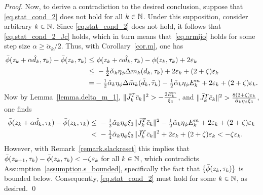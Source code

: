 \begin{proof}
    Now, to derive a contradiction to the desired conclusion, suppose that \eqref{eq.stat_cond_2} does not hold for all $k \in \mathbb{N}$.  Under this supposition, consider arbitrary $k \in \mathbb{N}$.  Since \eqref{eq.stat_cond_2} does not hold, it follows that \eqref{eq.stat_cond_2_Jc} holds, which in turn means that~\eqref{eq.armijo} holds for some step size $\alpha \geq \check\alpha_k/2$.  Thus, with Corollary~\ref{cor.m}, one has
    \begin{align*}
      {\bar \phi}(z_k + \alpha {\hat d}_k, \tau_k) - {\bar \phi}(z_k, \tau_k)
      \leq&\ \phi(z_k + \alpha {\hat d}_k, \tau_k) - \phi(z_k, \tau_k) + 2 \varepsilon_k \\
      \leq&\ - \tfrac{1}{2} \check \alpha_k \eta_\phi \Delta m_k(d_k, \tau_k) + 2 \varepsilon_k + (2 + \zeta) \varepsilon_k \\
         = & - \tfrac{1}{2} \check \alpha_k \eta_\phi \Delta {\bar m}_k({\bar d}_k, {\bar \tau}_k) - \tfrac{1}{2} \check \alpha_k \eta_\phi E_k^m + 2 \varepsilon_k + (2 + \zeta) \varepsilon_k.
    \end{align*}
    Now by Lemma~\ref{lemma.delta_m_1}, $\|{\bar J}_k^T {\bar c}_k\|^2 > -\tfrac{2E_k^m}{\xi_3}$, and $\|{\bar J}_k^T {\bar c}_k \|^2 > \frac{8(2 + \zeta) \varepsilon_k}{\check \alpha_k \eta_\phi \xi_3}$, one finds
    \begin{align*}
      {\bar \phi}(z_k + \alpha {\hat d}_k, \tau_k) - {\bar \phi}(z_k, \tau_k)
      \leq&\ - \tfrac{1}{2} \check \alpha_k \eta_\phi \xi_3 \|{\bar J}_k^T {\bar c}_k\|^2 -\tfrac{1}{2} \check \alpha_k \eta_\phi E_k^m + 2 \varepsilon_k + (2 + \zeta) \varepsilon_k \\
      <&\ - \tfrac{1}{4} \check \alpha_k \eta_\phi \xi_3 \| {\bar J}_k^T {\bar c}_k \|^2 + 2 \varepsilon_k + (2 + \zeta) \varepsilon_k < - \zeta \varepsilon_k.
    \end{align*}
    However, with Remark~\ref{remark.slackreset} this implies that ${\bar \phi}(z_{k+1}, \tau_k) -  {\bar \phi}(z_k, \tau_k) < -\zeta \varepsilon_k$ for all $k \in \mathbb{N}$, which contradicts Assumption~\ref{assumption.s_bounded}, specifically the fact that $\{{\bar \phi}(z_k,\tau_k)\}$ is bounded below.  Consequently, \eqref{eq.stat_cond_2} must hold for some $k \in \mathbb{N}$, as desired.
  \qed
\end{proof}